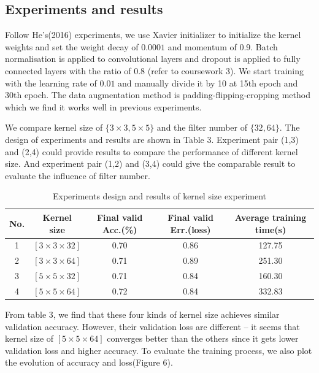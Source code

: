\documentclass[]{article}
\begin{document}
\subsection{Experiments and results}
Follow He's(2016) experiments, we use Xavier initializer to initialize the kernel weights and set the weight decay of $0.0001$ and momentum of 0.9. Batch normalisation is applied to convolutional layers and dropout is applied to fully connected layers with the ratio of $0.8$ (refer to coursework 3). We start training with the learning rate of $0.01$ and manually divide it by 10 at 15th epoch and 30th epoch. The data augmentation method is padding-flipping-cropping method which we find it works well in previous experiments.

We compare kernel size of $\{3\times 3, 5\times 5 \}$ and the filter number of $\{32, 64\}$. The design of experiments and results are shown in Table 3. Experiment pair (1,3) and (2,4) could provide results to compare the performance of different kernel size. And experiment pair (1,2) and (3,4) could give the comparable result to evaluate the influence of filter number. 

\begin{table}[ht]
\centering 
\caption{Experiments design and results of kernel size experiment}
\begin{tabular}{c c c c c}
\toprule
No. & Kernel size & Final valid Acc.(\%) & Final valid Err.(loss) & Average training time(s)\\
\midrule
1 & $[3\times 3 \times 32]$ & 0.70 & 0.86 & 127.75  \\
2 & $[3\times 3 \times 64]$ & 0.71 & 0.89 & 251.30 \\
3 & $[5\times 5 \times 32]$ & 0.71 & 0.84 & 160.30 \\
4 & $[5\times 5 \times 64]$ & 0.72 & 0.84 & 332.83 \\
\bottomrule
\end{tabular}
\end{table}

From table 3, we find that these four kinds of kernel size achieves similar validation accuracy. However, their validation loss are different -- it seems that kernel size of $[5\times 5 \times 64]$ converges better than the others since it gets lower validation loss and higher accuracy. To evaluate the training process, we also plot the evolution of accuracy and loss(Figure 6).
\end{document}
